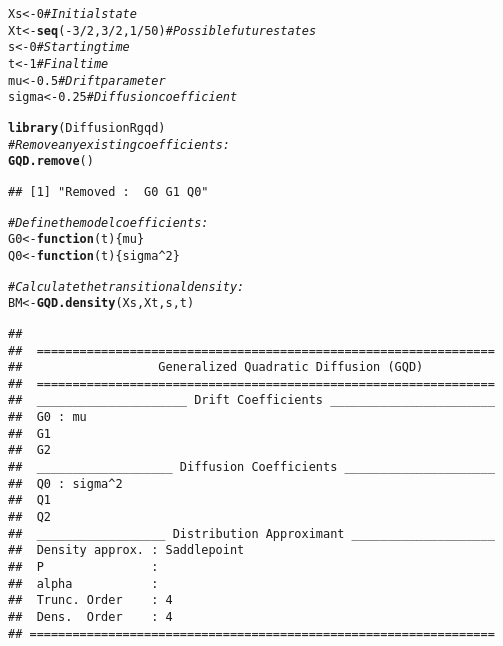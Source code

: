 \documentclass[a4paper,11pt]{article}\usepackage[]{graphicx}\usepackage[]{color}
\makeatletter
\newcommand{\hlnum}[1]{\textcolor[rgb]{0.686,0.059,0.569}{#1}}%
\newcommand{\hlcom}[1]{\textcolor[rgb]{0.678,0.584,0.686}{\textit{#1}}}%
\newcommand{\hlopt}[1]{\textcolor[rgb]{0,0,0}{#1}}%
\newcommand{\hlstd}[1]{\textcolor[rgb]{0.345,0.345,0.345}{#1}}%
\newcommand{\hlkwa}[1]{\textcolor[rgb]{0.161,0.373,0.58}{\textbf{#1}}}%
\newcommand{\hlkwb}[1]{\textcolor[rgb]{0.69,0.353,0.396}{#1}}%
\newcommand{\hlkwc}[1]{\textcolor[rgb]{0.333,0.667,0.333}{#1}}%
\newcommand{\hlkwd}[1]{\textcolor[rgb]{0.737,0.353,0.396}{\textbf{#1}}}%
\newenvironment{kframe}{%
 \def\at@end@of@kframe{}%
 \ifinner\ifhmode%
  \def\at@end@of@kframe{\end{minipage}}%
  \begin{minipage}{\columnwidth}%
 \fi\fi%
 \def\FrameCommand##1{\hskip\@totalleftmargin \hskip-\fboxsep
 \colorbox{shadecolor}{##1}\hskip-\fboxsep
     \hskip-\linewidth \hskip-\@totalleftmargin \hskip\columnwidth}%
 \MakeFramed {\advance\hsize-\width
   \@totalleftmargin\z@ \linewidth\hsize
   \@setminipage}}%
 {\par\unskip\endMakeFramed%
 \at@end@of@kframe}
\newenvironment{knitrout}{}{} %
\makeatother
\begin{document}
\begin{knitrout}
\color{fgcolor}\begin{kframe}
\begin{alltt}
\hlstd{Xs} \hlkwb{<-} \hlnum{0}                 \hlcom{# Initial state}
\hlstd{Xt} \hlkwb{<-} \hlkwd{seq}\hlstd{(}\hlopt{-}\hlnum{3}\hlopt{/}\hlnum{2}\hlstd{,}\hlnum{3}\hlopt{/}\hlnum{2}\hlstd{,}\hlnum{1}\hlopt{/}\hlnum{50}\hlstd{)}\hlcom{# Possible future states}
\hlstd{s}  \hlkwb{<-} \hlnum{0}                 \hlcom{# Starting time}
\hlstd{t}  \hlkwb{<-} \hlnum{1}                 \hlcom{# Final time}
\hlstd{mu}    \hlkwb{<-} \hlnum{0.5}            \hlcom{# Drift parameter}
\hlstd{sigma} \hlkwb{<-} \hlnum{0.25}           \hlcom{# Diffusion coefficient}

\hlkwd{library}\hlstd{(DiffusionRgqd)}
\hlcom{# Remove any existing coefficients:}
\hlkwd{GQD.remove}\hlstd{()}
\end{alltt}
\begin{verbatim}
## [1] "Removed :  G0 G1 Q0"
\end{verbatim}
\begin{alltt}
\hlcom{# Define the model coefficients:}
\hlstd{G0} \hlkwb{<-} \hlkwa{function}\hlstd{(}\hlkwc{t}\hlstd{)\{mu\}}
\hlstd{Q0} \hlkwb{<-} \hlkwa{function}\hlstd{(}\hlkwc{t}\hlstd{)\{sigma}\hlopt{^}\hlnum{2}\hlstd{\}}

\hlcom{# Calculate the transitional density:}
\hlstd{BM} \hlkwb{<-} \hlkwd{GQD.density}\hlstd{(Xs,Xt,s,t)}
\end{alltt}
\begin{verbatim}
##                                                                  
##  ================================================================
##                   Generalized Quadratic Diffusion (GQD)          
##  ================================================================
##  _____________________ Drift Coefficients _______________________
##  G0 : mu                                                         
##  G1                                                              
##  G2                                                              
##  ___________________ Diffusion Coefficients _____________________
##  Q0 : sigma^2                                                    
##  Q1                                                              
##  Q2                                                              
##  __________________ Distribution Approximant ____________________
##  Density approx. : Saddlepoint                                   
##  P               :                                               
##  alpha           :                                               
##  Trunc. Order    : 4                                             
##  Dens.  Order    : 4                                             
## =================================================================
\end{verbatim}
\end{kframe}
\end{knitrout}
\end{document}

